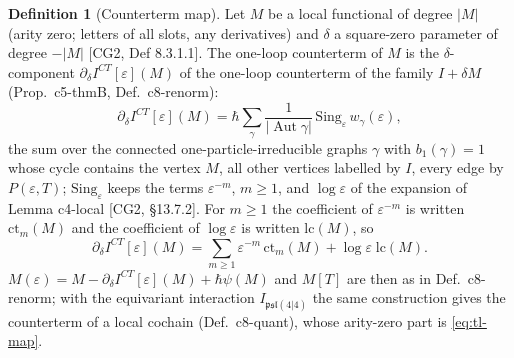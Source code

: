 \documentclass[11pt]{article}
\numberwithin{equation}{section}
\theoremstyle{plain}
\theoremstyle{definition}
\newtheorem{definition}[theorem]{Definition}
\begin{document}
\begin{definition}[Counterterm map]
\label{def:tl-map}
Let $M$ be a local functional of degree $|M|$ (arity zero; letters of all slots, any derivatives) and $\delta$ a square-zero parameter of degree $-|M|$ [CG2, Def 8.3.1.1]. The one-loop counterterm of $M$ is the $\delta$-component $\partial_\delta I^{CT}[\varepsilon](M)$ of the one-loop counterterm of the family $I+\delta M$ (Prop.~c5-thmB, Def.~c8-renorm):
\begin{equation}
\partial_\delta I^{CT}[\varepsilon](M)=\hbar\sum_{\gamma}\frac{1}{|\operatorname{Aut}\gamma|}\,\mathrm{Sing}_\varepsilon\,w_\gamma(\varepsilon),
\label{eq:tl-map}
\end{equation}
the sum over the connected one-particle-irreducible graphs $\gamma$ with $b_1(\gamma)=1$ whose cycle contains the vertex $M$, all other vertices labelled by $I$, every edge by $P(\varepsilon,T)$; $\mathrm{Sing}_\varepsilon$ keeps the terms $\varepsilon^{-m}$, $m\ge1$, and $\log\varepsilon$ of the expansion of Lemma c4-local [CG2, §13.7.2]. For $m\ge1$ the coefficient of $\varepsilon^{-m}$ is written $\mathrm{ct}_m(M)$ and the coefficient of $\log\varepsilon$ is written $\mathrm{lc}(M)$, so
\[
\partial_\delta I^{CT}[\varepsilon](M)=\sum_{m\ge1}\varepsilon^{-m}\,\mathrm{ct}_m(M)+\log\varepsilon\;\mathrm{lc}(M).
\]
$M(\varepsilon)=M-\partial_\delta I^{CT}[\varepsilon](M)+\hbar\psi(M)$ and $M[T]$ are then as in Def.~c8-renorm; with the equivariant interaction $I_{\mathfrak{psl}(4|4)}$ the same construction gives the counterterm of a local cochain (Def.~c8-quant), whose arity-zero part is \eqref{eq:tl-map}.
\end{definition}
\end{document}
